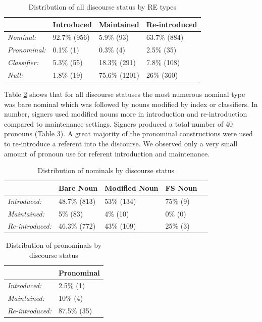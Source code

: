 \documentclass[review]{elsarticle} %
\begin{document}
\begin{table}
\small
\caption{Distribution of all discourse status by RE types}
\label{tab:my-table}
\begin{tabular}{llll}
\hline
                     & Introduced    & Maintained     & Re-introduced \\ \hline
\textit{Nominal:}    & 92.7\% (956) & 5.9\% (93)    & 63.7\% (884) \\
\textit{Pronominal:} & 0.1\% (1)    & 0.3\% (4)     & 2.5\% (35)   \\
\textit{Classifier:} & 5.3\% (55)   & 18.3\% (291)  & 7.8\% (108)     \\
\textit{Null:}       & 1.8\% (19)   & 75.6\% (1201) & 26\% (360) \\ \hline
\end{tabular}%
\end{table}

Table \ref{tab:my-table2} shows that for all discourse statuses the most
numerous nominal type was bare nominal which was followed by nouns
modified by index or classifiers. In number, signers used modified nouns
more in introduction and re-introduction compared to maintenance
settings. Signers produced a total number of 40 pronouns (Table
\ref{tab:my-table3}). A great majority of the pronominal constructions
were used to re-introduce a referent into the discourse. We observed
only a very small amount of pronoun use for referent introduction and
maintenance.

\begin{table}
\small
\caption{Distribution of nominals by discourse status}
\label{tab:my-table2}
\begin{tabular}{lllll}
\hline
                        & Bare Noun  & Modified Noun & FS Noun \\ \hline
\textit{Introduced:}    & 48.7\% (813) & 53\% (134)     & 75\% (9) \\
\textit{Maintained:}    & 5\% (83)  & 4\% (10)      & 0\% (0) \\
\textit{Re-introduced:} & 46.3\% (772) & 43\% (109)     & 25\% (3) \\ \hline
\end{tabular}
\end{table}

\begin{table}
\small
\caption{Distribution of pronominals by discourse status}
\label{tab:my-table3}
\begin{tabular}{ll}
\hline
                        & Pronominal  \\ \hline
\textit{Introduced:}    & 2.5\% (1)   \\
\textit{Maintained:}    & 10\% (4)    \\
\textit{Re-introduced:} & 87.5\% (35) \\ \hline
\end{tabular}
\end{table}
\end{document}
